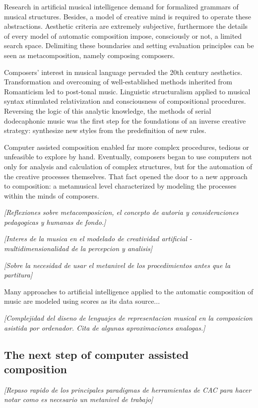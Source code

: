 \documentclass{article}
\begin{document}
Research in artificial musical intelligence demand for formalized
grammars of musical structures. Besides, a model of creative
mind is required to operate these abstractions.
Aesthetic criteria are extremely subjective, furthermore the details
of every model of automatic composition impose, consciously
or not, a limited search space. Delimiting these
boundaries and setting evaluation principles can be seen as
metacomposition, namely composing composers.

Composers' interest in musical language pervaded the 20th
century aesthetics. Transformation and overcoming of well-established methods
inherited from Romanticism led to post-tonal
music. Linguistic structuralism applied to musical
syntax stimulated relativization and consciousness of
compositional procedures. Reversing the logic of this analytic knowledge, the methods
of serial dodecaphonic music was the first step for the foundations of
an inverse creative strategy: synthesize new styles from the predefinition of new rules. 

Computer assisted composition enabled
far more complex procedures, tedious or unfeasible to explore by hand. Eventually, composers began to use computers not only for analysis and calculation of complex structures, but for the automation of the creative processes themselves. That fact opened the door to a new approach to composition: a metamusical level characterized by modeling the processes within the minds of composers. 

{\color{gray} \textsl{[Reflexiones sobre metacomposicion, el concepto de autoria y consideraciones pedagogicas y humanas de fondo.]}}


{\color{gray} \textsl{[Interes de la musica en el modelado de creatividad artificial - multidimensionalidad de la percepcion y analisis]}}

{\color{gray} \textsl{[Sobre la necesidad de usar el metanivel de los procedimientos antes que la partitura]}}

Many approaches to artificial intelligence applied to the automatic composition of music are modeled using scores as its data source...

{\color{gray} \textsl{[Complejidad del diseno de lenguajes de representacion musical en la composicion asistida por ordenador. Cita de algunas aproximaciones analogas.]}}

\subsection{The next step of computer assisted composition}
{\color{gray} \textsl{[Repaso rapido de los principales paradigmas de herramientas de CAC para hacer notar como es necesario un metanivel de trabajo]}}
\end{document}
